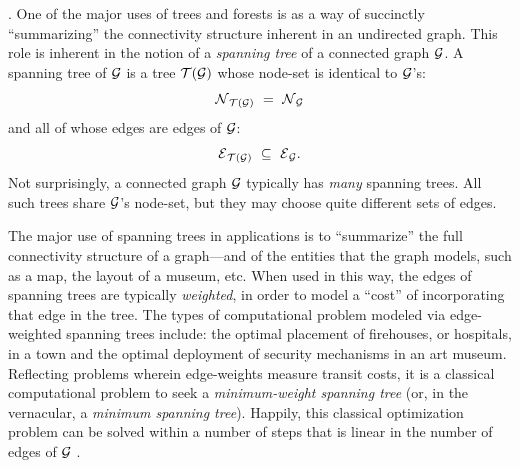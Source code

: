 .
One of the major uses of trees and forests is as a way of succinctly
``summarizing'' the connectivity structure inherent in an undirected
graph.  This role is inherent in the notion of a {\it spanning tree}
  
of a connected graph $\mbox{$\cal G$}$.  A spanning tree of $\mbox{$\cal G$}$ is a tree $\mbox{$\cal T$}(\mbox{$\cal G$})$
whose node-set is identical to $\mbox{$\cal G$}$'s:
\[ \mbox{$\cal N$}_{\mbox{{\scriptsize $\cal T$}}(\mbox{{\scriptsize $\cal G$}})} \ = \ \mbox{$\cal N$}_{\mbox{{\scriptsize $\cal G$}}} \]
and all of whose edges are edges of $\mbox{$\cal G$}$:
\[ \mbox{$\cal E$}_{\mbox{{\scriptsize $\cal T$}}(\mbox{{\scriptsize $\cal G$}})} \ \subseteq \ \mbox{$\cal E$}_{\mbox{{\scriptsize $\cal G$}}}. \]
Not surprisingly, a connected graph $\mbox{$\cal G$}$  typically has {\em many}
spanning trees.  All such trees share $\mbox{$\cal G$}$'s node-set, but they may
choose quite different sets of edges.


The major use of spanning trees in applications is to ``summarize''
the full connectivity structure of a graph---and of the entities that
the graph models, such as a map, the layout of a museum, etc.  When
used in this way, the edges of spanning trees are typically {\em
  weighted},  in order to
model a ``cost'' of incorporating that edge in the tree.  The types of
computational problem modeled via edge-weighted spanning trees
include: the optimal placement of firehouses, or hospitals, in a town
and the optimal deployment of security mechanisms in an art museum.
Reflecting problems wherein edge-weights measure transit costs, it is
a classical computational problem to seek a {\em minimum-weight
  spanning tree} 
 (or, in the vernacular, a {\em
  minimum spanning tree}).  Happily, this classical optimization
problem can be solved within a number of steps that is linear in the
number of edges of $\mbox{$\cal G$}$ \cite{CLRS}.


